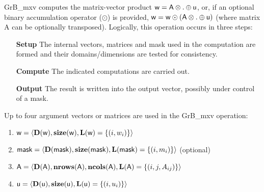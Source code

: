 {\sf GrB\_mxv} computes the matrix-vector product ${\sf w} = {\sf A}
\otimes . \oplus {\sf u}$, or, if an optional binary accumulation
operator ($\odot$) is provided, ${\sf w} = {\sf w} \odot \left({\sf A}
\otimes . \oplus {\sf u}\right)$ (where matrix {\sf A}
 can be optionally transposed).  Logically, this operation
occurs in three steps:
\begin{enumerate}[leftmargin=0.85in]
\item[\bf Setup] The internal vectors, matrices and mask used in the computation are formed and their domains/dimensions are tested for consistency.
\item[\bf Compute] The indicated computations are carried out.
\item[\bf Output] The result is written into the output vector, possibly under control of a mask.
\end{enumerate}

Up to four argument vectors or matrices are used in the {\sf GrB\_mxv} operation:
\begin{enumerate}
	\item ${\sf w} = \langle \bold{D}({\sf w}),\bold{size}({\sf w}),\bold{L}({\sf w}) = \{(i,w_i) \} \rangle$
	\item ${\sf mask} = \langle \bold{D}({\sf mask}),\bold{size}({\sf mask}),\bold{L}({\sf mask}) = \{(i,m_i) \} \rangle$ (optional)
	\item ${\sf A} = \langle \bold{D}({\sf A}),\bold{nrows}({\sf A}), \bold{ncols}({\sf A}),\bold{L}({\sf A}) = \{(i,j,A_{ij}) \} \rangle$
	\item ${\sf u} = \langle \bold{D}({\sf u}),\bold{size}({\sf u}),\bold{L}({\sf u}) = \{(i,u_i) \} \rangle$
\end{enumerate}

